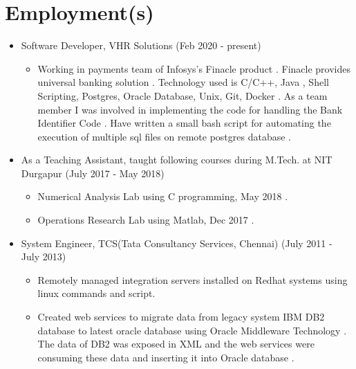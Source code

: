 \documentclass[a4paper,10pt]{article}
\begin{document}
	\section{Employment(s)}
	\begin{itemize}
	        \item Software Developer, VHR Solutions (Feb 2020 - present)
                \begin{itemize}
                    \item Working in payments team of Infosys’s Finacle product . Finacle provides universal banking solution . Technology used is C/C++, Java
, Shell Scripting, Postgres, Oracle Database, Unix, Git, Docker . As a team member I was involved in implementing the code for handling the Bank Identifier Code . Have written a small bash script for automating the execution of multiple sql files on remote postgres database .
                \end{itemize}
			\item As  a Teaching Assistant, taught following courses during M.Tech. at NIT Durgapur (July 2017 - May 2018)
                \begin{itemize}
                    \item Numerical Analysis Lab using C programming, May 2018 .
                    \item Operations Research Lab using Matlab, Dec 2017 .
                \end{itemize}
            \item System Engineer, TCS(Tata Consultancy Services, Chennai) (July 2011 - July 2013)
		        \begin{itemize}
			    	\item Remotely managed integration servers installed on Redhat systems using linux commands and script.
					\item Created web services to migrate data from legacy system IBM DB2 database to latest oracle database using Oracle Middleware Technology .
					The data  of DB2 was exposed in XML  and the web services were consuming these data and inserting it into Oracle database .
			\end{itemize}
	\end{itemize}
    
    
\end{document}
